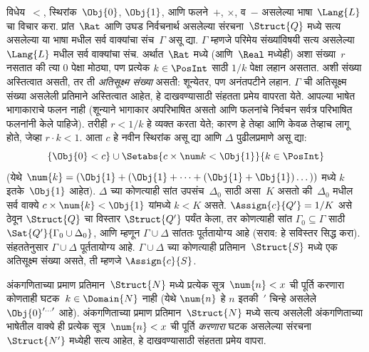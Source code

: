 \begin{ex}
विधेय~$<$, स्थिरांक~$\Obj{0}$, $\Obj{1}$, आणि
फलने~$+$, $\times$, व~$-$ असलेल्या भाषा~$\Lang{L}$ चा
विचार करा. प्रांत~$\Rat$ आणि उघड निर्वचनार्थ असलेल्या
संरचना~$\Struct{Q}$ मध्ये सत्य असलेल्या या भाषा मधील सर्व
वाक्यांचा संच~$\Gamma$ असू द्या. $\Gamma$ म्हणजे परिमेय
संख्यांविषयी सत्य असलेल्या~$\Lang{L}$ मधील सर्व वाक्यांचा संच.
अर्थात~$\Rat$ मध्ये (आणि~$\Real$ मध्येही) अशा संख्या~$r$ नसतात की त्या
$0$ पेक्षा मोठ्या, पण प्रत्येक $k \in \PosInt$ साठी $1/k$ पेक्षा लहान
असतात. अशी संख्या अस्तित्वात असती, तर ती \emph{अतिसूक्ष्म संख्या} असती:
शून्येतर, पण अनंतपटीने लहान. $\Gamma$ ची अतिसूक्ष्म संख्या असलेली प्रतिमाने
अस्तित्वात आहेत, हे दाखवण्यासाठी संहतता प्रमेय वापरता येते. आपल्या भाषेत
भागाकाराचे फलन नाही (शून्याने भागाकार अपरिभाषित असतो आणि
फलनांचे निर्वचन सर्वत्र परिभाषित फलनांनी केले पाहिजे). तरीही
$r < 1/k$ हे व्यक्त करता येते; कारण हे तेव्हा आणि केवळ तेव्हाच लागू होते,
जेव्हा $r \cdot k < 1$. आता $c$ हे नवीन स्थिरांक असू द्या आणि
$\Delta$ पुढीलप्रमाणे असू द्या:
\[\{\Obj{0} < c\}
\cup \Setabs{ c \times \num k < \Obj{1} }{k \in \PosInt}
\]
(येथे $\num{k} = (\Obj{1} + (\Obj{1} + \dots + (\Obj{1} +
\Obj{1})\dots))$ मध्ये $k$ इतके~$\Obj{1}$ आहेत). $\Delta$ च्या कोणत्याही
सांत उपसंच~$\Delta_0$ साठी असा~$K$ असतो की~$\Delta_0$ मधील सर्व
वाक्ये $c \times \num{k} < \Obj{1}$ यांमध्ये $k < K$ असते.
$\Assign{c}{Q'} = 1/K$ असे ठेवून $\Struct{Q}$ चा विस्तार
$\Struct{Q'}$ पर्यंत केला, तर कोणत्याही सांत $\Gamma_0 \subseteq \Gamma$
साठी $\Sat{Q'}{\Gamma_0 \cup \Delta_0}$, आणि म्हणून $\Gamma \cup \Delta$
सांततः पूर्ततायोग्य आहे (सराव: हे सविस्तर सिद्ध करा). संहततेनुसार
$\Gamma \cup \Delta$ पूर्ततायोग्य आहे. $\Gamma \cup \Delta$ च्या
कोणत्याही प्रतिमान~$\Struct{S}$ मध्ये एक अतिसूक्ष्म संख्या असते, ती म्हणजे
$\Assign{c}{S}$.
\end{ex}



\begin{prob}
अंकगणिताच्या प्रमाण प्रतिमान~$\Struct{N}$ मध्ये प्रत्येक सूत्र~$\num{n}
< x$ ची पूर्ति करणारा कोणताही घटक~$k \in \Domain{N}$ नाही
(येथे $\num{n}$ हे $n$ इतकी~$\prime$ चिन्हे असलेले
$\Obj{0}^{\prime\dots\prime}$ आहे). अंकगणिताच्या प्रमाण
प्रतिमान~$\Struct{N}$ मध्ये सत्य असलेली अंकगणिताच्या भाषेतील
वाक्ये ही प्रत्येक सूत्र~$\num{n} < x$ ची पूर्ति \emph{करणारा}
घटक असलेल्या संरचना~$\Struct{N'}$ मध्येही सत्य आहेत,
हे दाखवण्यासाठी संहतता प्रमेय वापरा.
\end{prob}



